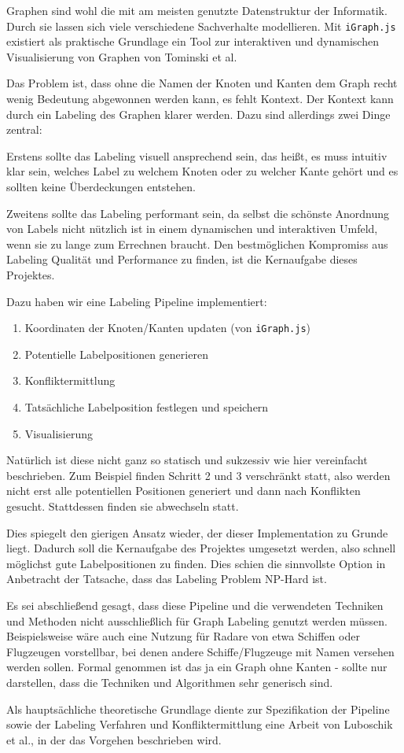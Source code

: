 Graphen sind wohl die mit am meisten genutzte Datenstruktur der Informatik.
Durch sie lassen sich viele verschiedene Sachverhalte modellieren.
Mit \texttt{iGraph.js} existiert als praktische Grundlage ein Tool zur interaktiven und dynamischen Visualisierung von Graphen von Tominski et al.\cite{interactive}

Das Problem ist, dass ohne die Namen der Knoten und Kanten dem Graph recht wenig Bedeutung abgewonnen werden kann,
es fehlt Kontext. Der Kontext kann durch ein Labeling des Graphen klarer werden. Dazu sind allerdings zwei Dinge zentral:

Erstens sollte das Labeling visuell ansprechend sein, das heißt, es muss intuitiv klar sein, welches Label zu welchem Knoten oder zu welcher Kante gehört
und es sollten keine Überdeckungen entstehen.

Zweitens sollte das Labeling performant sein, da selbst die schönste Anordnung von Labels nicht nützlich ist in einem dynamischen und interaktiven Umfeld, wenn sie zu lange zum Errechnen braucht.
Den bestmöglichen Kompromiss aus Labeling Qualität und Performance zu finden, ist die Kernaufgabe dieses Projektes.

Dazu haben wir eine Labeling Pipeline implementiert:
\begin{enumerate}
    \item Koordinaten der Knoten/Kanten updaten (von \texttt{iGraph.js})
    \item Potentielle Labelpositionen generieren
    \item Konfliktermittlung
    \item Tatsächliche Labelposition festlegen und speichern
    \item Visualisierung
\end{enumerate}

Natürlich ist diese nicht ganz so statisch und sukzessiv wie hier vereinfacht beschrieben.
Zum Beispiel finden Schritt 2 und 3 verschränkt statt, also werden nicht erst alle potentiellen Positionen generiert und dann nach Konflikten gesucht.
Stattdessen finden sie abwechseln statt.

Dies spiegelt den gierigen Ansatz wieder, der dieser Implementation zu Grunde liegt. Dadurch soll die Kernaufgabe des Projektes umgesetzt werden,
also schnell möglichst gute Labelpositionen zu finden. Dies schien die sinnvollste Option in Anbetracht der Tatsache, dass das Labeling Problem NP-Hard ist.\cite{nphard}

Es sei abschließend gesagt, dass diese Pipeline und die verwendeten Techniken und Methoden nicht ausschließlich für Graph Labeling genutzt werden müssen.
Beispielsweise wäre auch eine Nutzung für Radare von etwa Schiffen oder Flugzeugen vorstellbar, bei denen andere Schiffe/Flugzeuge mit Namen versehen werden sollen.
Formal genommen ist das ja ein Graph ohne Kanten - sollte nur darstellen, dass die Techniken und Algorithmen sehr generisch sind.

Als hauptsächliche theoretische Grundlage diente zur Spezifikation der Pipeline sowie der Labeling Verfahren und Konfliktermittlung eine Arbeit von Luboschik et al.\cite{main}, in der das Vorgehen beschrieben wird.